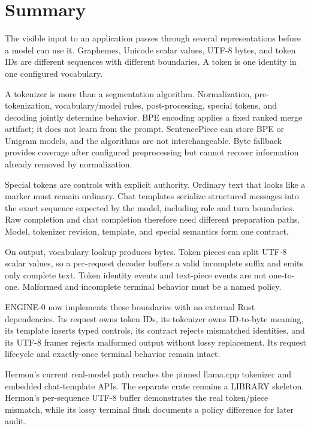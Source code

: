 \section{Summary}\label{summary-1}

The visible input to an application passes through several
representations before a model can use it. Graphemes, Unicode scalar
values, UTF-8 bytes, and token IDs are different sequences with
different boundaries. A token is one identity in one configured
vocabulary.

A tokenizer is more than a segmentation algorithm. Normalization,
pre-tokenization, vocabulary/model rules, post-processing, special
tokens, and decoding jointly determine behavior. BPE encoding applies a
fixed ranked merge artifact; it does not learn from the prompt.
SentencePiece can store BPE or Unigram models, and the algorithms are
not interchangeable. Byte fallback provides coverage after configured
preprocessing but cannot recover information already removed by
normalization.

Special tokens are controls with explicit authority. Ordinary text that
looks like a marker must remain ordinary. Chat templates serialize
structured messages into the exact sequence expected by the model,
including role and turn boundaries. Raw completion and chat completion
therefore need different preparation paths. Model, tokenizer revision,
template, and special semantics form one contract.

On output, vocabulary lookup produces bytes. Token pieces can split
UTF-8 scalar values, so a per-request decoder buffers a valid incomplete
suffix and emits only complete text. Token identity events and
text-piece events are not one-to-one. Malformed and incomplete terminal
behavior must be a named policy.

ENGINE-0 now implements these boundaries with no external Rust
dependencies. Its request owns token IDs, its tokenizer owns ID-to-byte
meaning, its template inserts typed controls, its contract rejects
mismatched identities, and its UTF-8 framer rejects malformed output
without lossy replacement. Its request lifecycle and exactly-once
terminal behavior remain intact.

Hermon's current real-model path reaches the pinned llama.cpp tokenizer
and embedded chat-template APIs. The separate
\texttt{} crate remains a LIBRARY skeleton.
Hermon's per-sequence UTF-8 buffer demonstrates the real token/piece
mismatch, while its lossy terminal flush documents a policy difference
for later audit.

